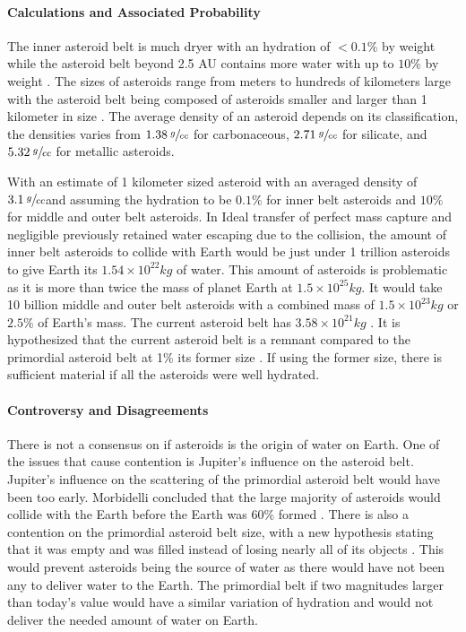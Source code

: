 \paragraph{Calculations and Associated Probability}
The inner asteroid belt is much dryer with an hydration of \(<0.1\%\) by weight while the  asteroid belt beyond 2.5 AU contains more water with up to \(10\%\) by weight \cite{morbidelli2000source}. The sizes of asteroids range from meters to hundreds of kilometers large with the asteroid belt being composed of asteroids smaller and larger than 1 kilometer in size \cite{asteroid_AvgSz}. The average density of an asteroid depends on its classification, the densities varies from \(1.38 \: \sfrac{g}{cc}\) for carbonaceous, \(2.71 \: \sfrac{g}{cc}\) for silicate, and \(5.32 \: \sfrac{g}{cc}\) for metallic asteroids\cite{AsteroidBeltMass}. 

With an estimate of 1 kilometer sized asteroid with an averaged density of \(3.1 \: \sfrac{g}{cc}\)and assuming the hydration to be \(0.1\%\) for inner belt asteroids and \(10\%\) for middle and outer belt asteroids.
In Ideal transfer of perfect mass capture and negligible previously retained water escaping due to the collision, the amount of inner belt asteroids to collide with Earth would be just under 1 trillion asteroids to give Earth its \(1.54\times 10^{22} kg\) of water. This amount of asteroids is problematic as it is more than twice the mass of planet Earth at \(1.5\times 10^{25} kg\).
It would take 10 billion middle and outer belt asteroids with a combined mass of \(1.5\times 10^{23} kg\) or \(2.5\%\) of Earth's mass.
The current asteroid belt has \(3.58 \times 10^{21}kg\) \cite{AsteroidBeltMass}.
It is hypothesized that the current asteroid belt is a remnant compared to the primordial asteroid belt at 1\% its former size \cite{PrimAstBelt}. If using the former size, there is sufficient material if all the asteroids were well hydrated.

\paragraph{Controversy and Disagreements}
There is not a consensus on if asteroids is the origin of water on Earth. One of the issues that cause contention is Jupiter's influence on the asteroid belt. Jupiter's influence on the scattering of the primordial asteroid belt would have been too early. Morbidelli concluded that the large majority of asteroids would collide with the Earth before the Earth was 60\% formed \cite{morbidelli2000source}. 
There is also a contention on the primordial asteroid belt size, with a new hypothesis stating that it was empty and was filled instead of losing nearly all of its objects \cite{Emptybelt}. This would prevent asteroids being the source of water as there would have not been any to deliver water to the Earth.
The primordial belt if two magnitudes larger than today's value would have a similar variation of hydration and would not deliver the needed amount of water on Earth.

